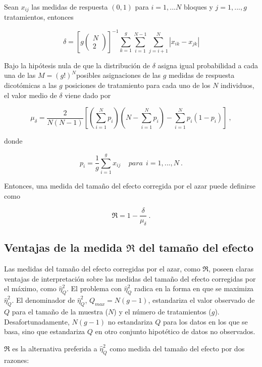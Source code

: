 \documentclass[12pt,a4paper,]{book}
\numberwithin{dummy}{section}
\theoremstyle{ocrenumbox}
\theoremstyle{blacknumex}
\theoremstyle{blacknumbox}
\theoremstyle{ocrenum}
\theoremstyle{ocrenum}
\begin{document}
Sean \(x_{ij}\) las medidas de respuesta \((0, 1)\) para
\(i = 1, . . . N\) bloques y \(j = 1, . . . , g\) tratamientos, entonces

\[
\delta=[g\left(\begin{array}{c}N\\ 2\end{array}\right)]^{-1}\sum_{k=1}^g\sum_{i=1}^{N-1}\sum_{j=i+1}^N|x_{ik}-x_{jk}|
\]

Bajo la hipótesis nula de que la distribución de \(\delta\) asigna igual
probabilidad a cada una de las \(M=(g!)^N\)posibles asignaciones de las
\(g\) medidas de respuesta dicotómicas a las \(g\) posiciones de
tratamiento para cada uno de los \(N\) individuos, el valor medio de
\(\delta\) viene dado por

\[
\mu_\delta=\frac{2}{N(N-1)}[(\sum_{i=1}^Np_i)(N-\sum_{i=1}^Np_i)-\sum_{i=1}^Np_i(1-p_i)]~,
\]

donde

\[
p_i=\frac{1}{g}\sum_{i=1}^gx_{ij}~~~~~para~~i=1,...,N~.
\]

Entonces, una medida del tamaño del efecto corregida por el azar puede
definirse como

\[
\mathfrak{R}=1-\frac{\delta}{\mu_\delta}~.
\]

\hypertarget{ventajas-de-la-medida-mathfrakr-del-tamauxf1o-del-efecto}{%
\subsection{\texorpdfstring{Ventajas de la medida \(\mathfrak{R}\) del
tamaño del
efecto}{Ventajas de la medida \textbackslash mathfrak\{R\} del tamaño del efecto}}\label{ventajas-de-la-medida-mathfrakr-del-tamauxf1o-del-efecto}}

Las medidas del tamaño del efecto corregidas por el azar, como
\(\mathfrak{R}\), poseen claras ventajas de interpretación sobre las
medidas del tamaño del efecto corregidas por el máximo, como
\(\hat\eta_Q^2\). El problema con \(\hat\eta_Q^2\) radica en la forma en
que se maximiza \(\hat\eta_Q^2\). El denominador de \(\hat\eta_Q^2\),
\(Q_{max} = N(g-1)\), estandariza el valor observado de \(Q\) para el
tamaño de la muestra (\(N\)) y el número de tratamientos (\(g\)).
Desafortunadamente, \(N(g - 1)\) no estandariza \(Q\) para los datos en
los que se basa, sino que estandariza \(Q\) en otro conjunto hipotético
de datos no observados.

\(\mathfrak{R}\) es la alternativa preferida a \(\hat\eta_Q^2\) como
medida del tamaño del efecto por dos razones:
\end{document}
